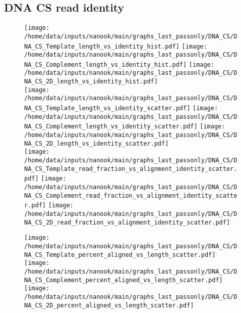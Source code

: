 \documentclass[a4paper,11pt,oneside]{article}
\begin{document}
\subsection*{DNA CS read identity}
\vspace{-3mm}
\begin{figure}[H]
\centering
\texttt{[image: /home/data/inputs/nanook/main/graphs\_last\_passonly/DNA\_CS/DNA\_CS\_Template\_length\_vs\_identity\_hist.pdf]}
\texttt{[image: /home/data/inputs/nanook/main/graphs\_last\_passonly/DNA\_CS/DNA\_CS\_Complement\_length\_vs\_identity\_hist.pdf]}
\texttt{[image: /home/data/inputs/nanook/main/graphs\_last\_passonly/DNA\_CS/DNA\_CS\_2D\_length\_vs\_identity\_hist.pdf]} \\
\texttt{[image: /home/data/inputs/nanook/main/graphs\_last\_passonly/DNA\_CS/DNA\_CS\_Template\_length\_vs\_identity\_scatter.pdf]}
\texttt{[image: /home/data/inputs/nanook/main/graphs\_last\_passonly/DNA\_CS/DNA\_CS\_Complement\_length\_vs\_identity\_scatter.pdf]}
\texttt{[image: /home/data/inputs/nanook/main/graphs\_last\_passonly/DNA\_CS/DNA\_CS\_2D\_length\_vs\_identity\_scatter.pdf]} \\
\texttt{[image: /home/data/inputs/nanook/main/graphs\_last\_passonly/DNA\_CS/DNA\_CS\_Template\_read\_fraction\_vs\_alignment\_identity\_scatter.pdf]}
\texttt{[image: /home/data/inputs/nanook/main/graphs\_last\_passonly/DNA\_CS/DNA\_CS\_Complement\_read\_fraction\_vs\_alignment\_identity\_scatter.pdf]}
\texttt{[image: /home/data/inputs/nanook/main/graphs\_last\_passonly/DNA\_CS/DNA\_CS\_2D\_read\_fraction\_vs\_alignment\_identity\_scatter.pdf]}
\end{figure}
\begin{figure}[H]
\centering
\texttt{[image: /home/data/inputs/nanook/main/graphs\_last\_passonly/DNA\_CS/DNA\_CS\_Template\_percent\_aligned\_vs\_length\_scatter.pdf]}
\texttt{[image: /home/data/inputs/nanook/main/graphs\_last\_passonly/DNA\_CS/DNA\_CS\_Complement\_percent\_aligned\_vs\_length\_scatter.pdf]}
\texttt{[image: /home/data/inputs/nanook/main/graphs\_last\_passonly/DNA\_CS/DNA\_CS\_2D\_percent\_aligned\_vs\_length\_scatter.pdf]}
\end{figure}
\end{document}
